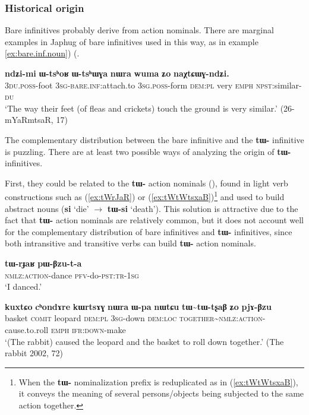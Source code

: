\documentclass[oneside,a4paper,11pt]{article}
\newcommand{\ipa}[1]{\textbf{\phon#1}} %
\newcommand{\tld}{\textasciitilde{}}
\begin{document}
\subsubsection{Historical origin}
Bare infinitives probably derive from action nominals. There are marginal examples in Japhug of bare infinitives used in this way, as in example \ref{ex:bare.inf.noun})  (\citealt{jacques14antipassive}.

\begin{exe}
\ex \label{ex:bare.inf.noun}
\gll \ipa{ndʑi-mi}   	\ipa{ɯ-tsʰoʁ}   	\ipa{ɯ-tsʰɯɣa}   	\ipa{nɯra}   	\ipa{wuma}   	\ipa{ʑo}   	\ipa{naχtɕɯɣ-ndʑi.}   \\
\textsc{3du.poss}-foot \textsc{3sg}-\textsc{bare.inf:}attach.to \textsc{3sg.poss}-form \textsc{dem:pl} very \textsc{emph}  \textsc{npst}:similar-\textsc{du}  \\
\glt `The way their feet (of fleas and crickets) touch the ground is very similar.' (26-mYaRmtsaR, 17)
\end{exe}

The complementary distribution between the bare infinitive and the \ipa{tɯ-} infinitive is puzzling. There are at least two possible ways of analyzing the origin of  \ipa{tɯ-} infinitives. 


First, they could be related to the \ipa{tɯ-} action nominals (\citealt{jacques14antipassive}), found in light verb constructions such as (\ref{ex:tWrJaR}) or (\ref{ex:tWtWtsxaB})\footnote{When the \ipa{tɯ-} nominalization prefix is reduplicated as in (\ref{ex:tWtWtsxaB}), it conveys the meaning of several persons/objects being subjected to the same action together. } and used to build abstract nouns (\ipa{si} `die' $\rightarrow$ \ipa{tɯ-si} `death'). This solution is attractive due to the fact that \ipa{tɯ-} action nominals are relatively common, but it does not account well for the complementary distribution of bare infinitives and \ipa{tɯ-} infinitives, since both intransitive and transitive verbs can build \ipa{tɯ-} action nominals.

\begin{exe}
\ex \label{ex:tWrJaR}
\gll \ipa{tɯ-rɟaʁ} \ipa{pɯ-βzu-t-a} \\
\textsc{nmlz:action}-dance \textsc{pfv}-do-\textsc{pst:tr-1sg} \\
\glt `I danced.'
\end{exe}

\begin{exe}
\ex \label{ex:tWtWtsxaB}
\gll
\ipa{kuxtɕo} 	\ipa{cʰondɤre}  	\ipa{kɯrtsɤɣ} 	\ipa{nɯra} 	\ipa{ɯ-pa} 	\ipa{nɯtɕu} 	\ipa{tɯ\tld{}tɯ-tʂaβ} 	\ipa{ʑo} 	\ipa{pjɤ-βzu} \\
basket \textsc{comit} leopard \textsc{dem:pl} \textsc{3sg}-down \textsc{dem:loc} \textsc{together}\tld{}\textsc{nmlz:action}-cause.to.roll \textsc{emph} \textsc{ifr:down}-make \\
\glt `(The rabbit) caused the leopard and the basket to roll down together.' (The rabbit 2002, 72)
\end{exe}
\end{document}
